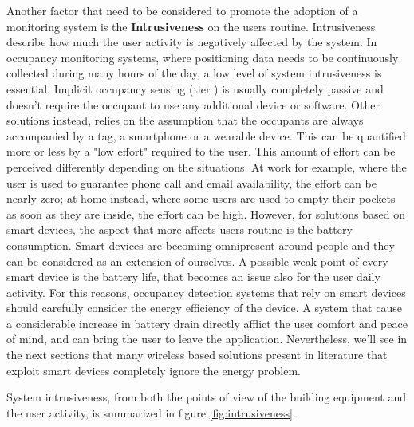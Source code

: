 Another factor that need to be considered to promote the adoption of a monitoring system is the \textbf{Intrusiveness} on the users routine. Intrusiveness describe how much the user activity is negatively affected by the system.
In occupancy monitoring systems, where positioning data needs to be continuously collected during many hours of the day, a low level of system intrusiveness is essential.
Implicit occupancy sensing (tier ) is usually completely passive and doesn't require the occupant to use any additional device or software.
Other solutions instead, relies on the assumption that the occupants are always accompanied by a tag, a smartphone or a wearable device. This can be quantified more or less by a "low effort" required to the user. This amount of effort can be perceived differently depending on the situations. At work for example, where the user is used to guarantee phone call and email availability, the effort can be nearly zero; at home instead, where some users are used to empty their pockets as soon as they are inside, the effort can be high.
However, for solutions based on smart devices, the aspect that more affects users routine is the battery consumption. Smart devices are becoming omnipresent around people and they can be considered as an extension of ourselves. A possible weak point of every smart device is the battery life, that becomes an issue also for the user daily activity. For this reasons, occupancy detection systems that rely on smart devices should carefully consider the energy efficiency of the device. A system that cause a considerable increase in battery drain directly afflict the user comfort and peace of mind, and can bring the user to leave the application. Nevertheless, we'll see in the next sections that many wireless based solutions present in literature that exploit smart devices completely ignore the energy problem.

System intrusiveness, from both the points of view of the building equipment and the user activity, is summarized in figure \ref{fig:intrusiveness}.


